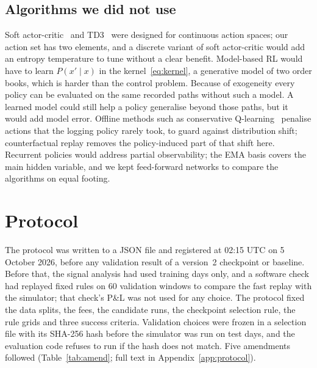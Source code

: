 \documentclass[12pt,a4paper]{article}
\begin{document}
\subsection{Algorithms we did not use}
Soft actor-critic~\cite{sac} and TD3~\cite{td3} were designed for continuous action spaces;
our action set has two elements, and a discrete variant of soft actor-critic would add an
entropy temperature to tune without a clear benefit. Model-based RL would have to learn
$P(x'\mid x)$ in the kernel~\eqref{eq:kernel}, a generative model of two order books, which is
harder than the control problem. Because of exogeneity every policy can be evaluated on the
same recorded paths without such a model. A learned model could still help a policy
generalise beyond those paths, but it would add model error. Offline methods such as
conservative Q-learning~\cite{cql} penalise actions that the logging policy rarely took, to
guard against distribution shift; counterfactual replay removes the policy-induced part of
that shift here. Recurrent policies would address partial
observability; the EMA basis covers the main hidden variable, and we kept feed-forward
networks to compare the algorithms on equal footing.

\section{Protocol}\label{sec:protocol}
The protocol was written to a JSON file and registered at 02:15 UTC on 5 October 2026, before
any validation result of a version~2 checkpoint or baseline. Before that, the signal analysis
had used training days only, and a software check had replayed fixed rules on 60 validation
windows to compare the fast replay with the simulator; that check's P\&L was not used for any
choice. The protocol fixed the data splits, the fees, the candidate runs, the checkpoint
selection rule, the rule grids and three success criteria. Validation choices were frozen in
a selection file with its SHA-256 hash before the
simulator was run on test days, and the evaluation code refuses to run if the hash does not
match. Five amendments followed (Table~\ref{tab:amend}; full text in
Appendix~\ref{app:protocol}).
\end{document}
